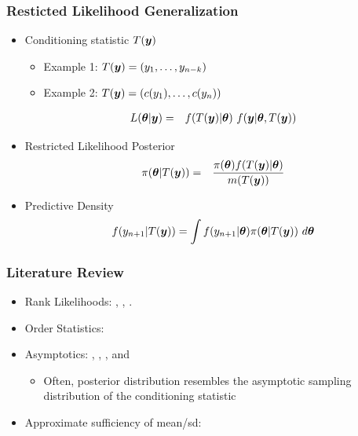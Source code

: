 \documentclass{beamer}
\def\bth{\mbox{\boldmath $\theta$}}
\newcommand{\by}{\mbox{\boldmath $y$}}
\begin{document}
\begin{frame}
\frametitle{Resticted Likelihood Generalization}
\begin{itemize}
	\item Conditioning statistic $T(\by)$
	\begin{itemize}
		\item Example 1: $T(\by) = (y_1, \ldots, y_{n-k})$
		\item Example 2: $T(\by) = (c(y_1),\ldots,c(y_n))$
	\end{itemize}
\begin{eqnarray*}
\label{FullLikelihood}
L(\bth | \by)  
& = & f(T(\by) | \bth) \,\, f(\by |\bth, T(\by)) 
\end{eqnarray*}
\item Restricted Likelihood Posterior
\begin{eqnarray*}
\label{RestrictedPosterior}
\pi(\bth | T(\by)) & = & \frac{\pi(\bth) f(T(\by) | \bth)}{m(T(\by))} 
\end{eqnarray*}

\item Predictive Density 
\begin{eqnarray*}
\label{RestrictedpredDist}
f(y_{n+1} | T(\by)) = \int f(y_{n+1} | \bth) \pi(\bth | T(\by))\ d\bth 
\end{eqnarray*}
\end{itemize}



\end{frame}

\begin{frame}
\frametitle{Literature Review}
\begin{itemize}
	\item Rank Likelihoods: \cite{savage1969}, \cite{pettitt1983, pettitt1982}, \cite{hoff2013}.  
	\item Order Statistics: \cite{lewis2012}
	\item Asymptotics: \cite{doksum1990}, \cite{clarke1995}, \cite{yuan2004},  and \cite{hwang2005}
	\begin{itemize}
		\item Often, posterior distribution resembles the asymptotic sampling distribution of the conditioning statistic
	\end{itemize}
	\item Approximate sufficiency of mean/sd: \cite{pratt1965}
\end{itemize}
\end{frame}
\end{document}
